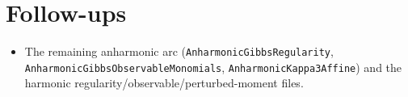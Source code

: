 \documentclass[11pt]{article}
\begin{document}
\section{Follow-ups}
\begin{itemize}[noitemsep]
  \item The remaining anharmonic arc (\texttt{AnharmonicGibbsRegularity},
    \texttt{AnharmonicGibbsObservableMonomials}, \texttt{AnharmonicKappa3Affine}) and the harmonic
    regularity/observable/perturbed-moment files.
\end{itemize}
\end{document}
